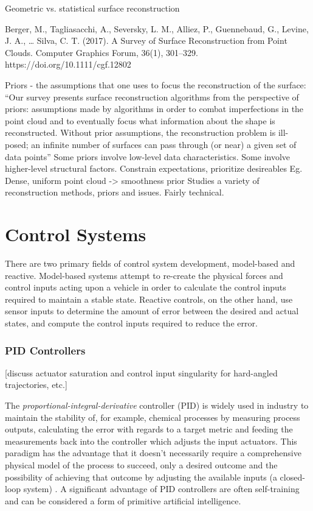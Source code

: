 \documentclass[10pt]{article}
\begin{document}
Geometric vs. statistical surface reconstruction

Berger, M., Tagliasacchi, A., Seversky, L. M., Alliez, P., Guennebaud, G., Levine, J. A., … Silva, C. T. (2017). A Survey of Surface Reconstruction from Point Clouds. Computer Graphics Forum, 36(1), 301–329. https://doi.org/10.1111/cgf.12802

Priors - the assumptions that one uses to focus the reconstruction of the surface:
“Our survey presents surface reconstruction algorithms from the perspective of priors: assumptions made by algorithms in order to combat imperfections in the point cloud and to eventually focus what information about the shape is reconstructed. Without prior assumptions, the reconstruction problem is ill-posed; an infinite number of surfaces can pass through (or near) a given set of data points”
Some priors involve low-level data characteristics. Some involve higher-level structural factors.
Constrain expectations, prioritize desireables
Eg. Dense, uniform point cloud -> smoothness prior
Studies a variety of reconstruction methods, priors and issues. 
Fairly technical.

\section{Control Systems}

There are two primary fields of control system development, model-based and reactive. Model-based systems attempt to re-create the physical forces and control inputs acting upon a vehicle in order to calculate the control inputs required to maintain a stable state. Reactive controls, on the other hand, use sensor inputs to determine the amount of error between the desired and actual states, and compute the control inputs required to reduce the error.

\subsubsection{PID Controllers}

[discuss actuator saturation and control input singularity for hard-angled trajectories, etc.]


The \emph{proportional-integral-derivative} controller (PID) is widely used in industry \cite{Soediono1989} to maintain the stability of, for example, chemical processes by measuring process outputs, calculating the error with regards to a target metric and feeding the measurements back into the controller which adjusts the input actuators. This paradigm has the advantage that it doesn’t necessarily require a comprehensive physical model of the process to succeed, only a desired outcome and the possibility of achieving that outcome by adjusting the available inputs (a closed-loop system) 	\cite{Soediono1989}. A significant advantage of PID controllers are often self-training and can be considered a form of primitive artificial intelligence.
\end{document}
